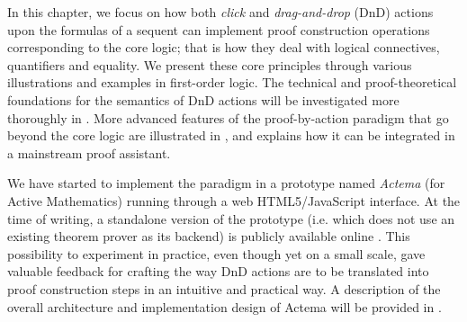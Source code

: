 


In this chapter, we focus on how both \emph{click} and \emph{drag-and-drop}
(DnD) actions upon the formulas of a sequent can implement proof construction
operations corresponding to the core logic; that is how they deal with logical
connectives, quantifiers and equality. We present these core principles through
various illustrations and examples in first-order logic. The technical and
proof-theoretical foundations for the semantics of DnD actions
will be investigated more thoroughly in .
More advanced features of the proof-by-action paradigm that go beyond the core
logic are illustrated in , and  explains how it
can be integrated in a mainstream proof assistant.

We have started to implement the paradigm in a prototype named {\em Actema} (for
Active Mathematics) running through a web HTML5/JavaScript interface. At the
time of writing, a standalone version of the prototype (i.e. which does not use
an existing theorem prover as its backend) is publicly available online
\cite{Actema:link}. This possibility to experiment in practice,
even though yet on a small scale, gave valuable feedback for crafting the way
DnD actions are to be translated into proof construction steps in an intuitive
and practical way. A description of the overall architecture and implementation
design of Actema will be provided in .

